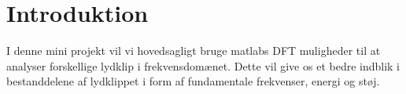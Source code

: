 \section{Introduktion}
I denne mini projekt vil vi hovedsagligt bruge matlabs DFT muligheder til at analyser forskellige lydklip i frekvensdomænet. Dette vil give os et bedre indblik i bestanddelene af lydklippet i form af fundamentale frekvenser, energi og støj. 